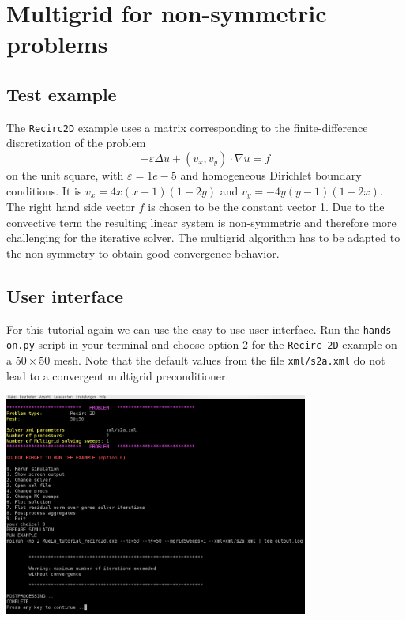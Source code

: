 \documentclass[10pt,fleqn]{book}
\begin{document}
\chapter{Multigrid for non-symmetric problems}

\section{Test example}
\label{sec:recircexample}
The \texttt{Recirc2D} example uses a matrix corresponding to the finite-difference discretization of the problem
\begin{displaymath}
-\varepsilon\Delta u + (v_x,v_y)\cdot \nabla u=f
\end{displaymath}
on the unit square, with $\varepsilon=1e-5$ and homogeneous Dirichlet boundary conditions. It is $v_x=4x(x-1)(1-2y)$ and $v_y=-4y(y-1)(1-2x)$.
The right hand side vector $f$ is chosen to be the constant vector 1. Due to the convective term the resulting linear system is non-symmetric and therefore more challenging for the iterative solver. The multigrid algorithm has to be adapted to the non-symmetry to obtain good convergence behavior.

\section{User interface}

For this tutorial again we can use the easy-to-use user interface. Run the \texttt{hands-on.py} script in your terminal and choose option 2 for the \texttt{Recirc 2D} example on a $50\times 50$ mesh.
Note that the default values from the file \texttt{xml/s2a.xml} do not lead to a convergent multigrid preconditioner.
\begin{center}\includegraphics[width=10cm]{pics/tut1_13.png} \end{center}
\end{document}
